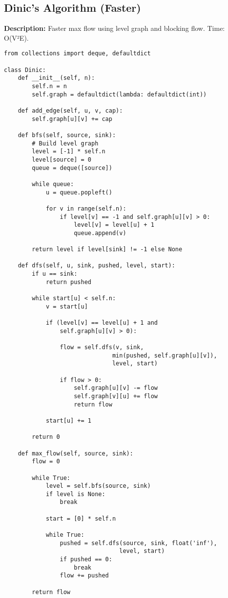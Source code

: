 \subsection{Dinic's Algorithm (Faster)}
\textbf{Description:} Faster max flow using level graph and blocking flow. Time: O(V²E).

\begin{lstlisting}
from collections import deque, defaultdict

class Dinic:
    def __init__(self, n):
        self.n = n
        self.graph = defaultdict(lambda: defaultdict(int))
    
    def add_edge(self, u, v, cap):
        self.graph[u][v] += cap
    
    def bfs(self, source, sink):
        # Build level graph
        level = [-1] * self.n
        level[source] = 0
        queue = deque([source])
        
        while queue:
            u = queue.popleft()
            
            for v in range(self.n):
                if level[v] == -1 and self.graph[u][v] > 0:
                    level[v] = level[u] + 1
                    queue.append(v)
        
        return level if level[sink] != -1 else None
    
    def dfs(self, u, sink, pushed, level, start):
        if u == sink:
            return pushed
        
        while start[u] < self.n:
            v = start[u]
            
            if (level[v] == level[u] + 1 and 
                self.graph[u][v] > 0):
                
                flow = self.dfs(v, sink, 
                               min(pushed, self.graph[u][v]),
                               level, start)
                
                if flow > 0:
                    self.graph[u][v] -= flow
                    self.graph[v][u] += flow
                    return flow
            
            start[u] += 1
        
        return 0
    
    def max_flow(self, source, sink):
        flow = 0
        
        while True:
            level = self.bfs(source, sink)
            if level is None:
                break
            
            start = [0] * self.n
            
            while True:
                pushed = self.dfs(source, sink, float('inf'),
                                 level, start)
                if pushed == 0:
                    break
                flow += pushed
        
        return flow
\end{lstlisting}

